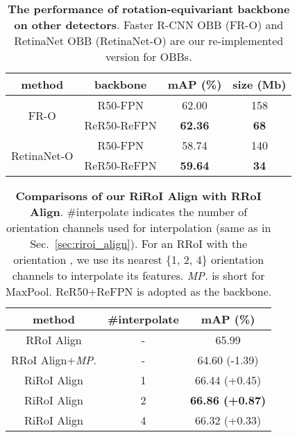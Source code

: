 \documentclass[final]{cvpr}
\begin{document}
{\begin{table}
      \begin{center}
    \small
\begin{tabular}{c|c|c|c} \hline
            method                             & backbone    & mAP (\%)        & size (Mb)   \\ \hline
            \multirow{2}{*}{FR-O}  & R50-FPN     & 62.00           & 158         \\
                                               & ReR50-ReFPN & \textbf{62.36}  & \textbf{68} \\ \hline
            \multirow{2}{*}{RetinaNet-O}     & R50-FPN     & 58.74           & 140         \\
                                               & ReR50-ReFPN & \textbf{59.64}  & \textbf{34} \\ \hline


        \end{tabular}
\end{center}       \vspace{-3mm}
      \caption{\textbf{The performance of rotation-equivariant backbone on other detectors}. Faster R-CNN OBB (FR-O) and RetinaNet OBB (RetinaNet-O) are our re-implemented version for OBBs.}
      \vspace{-1mm}
      \label{tab:other_method}
\end{table}

\begin{table}
      \begin{center}
    \small
\begin{tabular}{c|c|c} \hline
            method            & \#interpolate  & mAP (\%)               \\ \hline
            RRoI Align        & -              & 65.99                  \\
       RRoI Align+\emph{MP.}  & -              & 64.60 (-1.39)          \\
            RiRoI Align       & 1              & 66.44 (+0.45)          \\
            RiRoI Align       & 2              & \textbf{66.86 (+0.87)} \\
            RiRoI Align       & 4              & 66.32 (+0.33)          \\ \hline
        \end{tabular}
\end{center}       \vspace{-3mm}
      \caption{\textbf{Comparisons of our RiRoI Align with RRoI Align}. \#interpolate indicates the number of orientation channels used for interpolation (same as  in Sec.~\ref{sec:riroi_align}). For an RRoI with the orientation , we use its nearest \{1, 2, 4\} orientation channels to interpolate its features. \emph{MP.} is short for MaxPool. ReR50+ReFPN is adopted as the backbone.}
      \vspace{-1mm}
      \label{tab:riroi_align}
\end{table}

}
\end{document}
